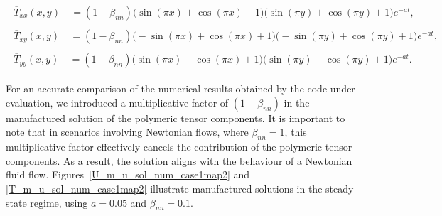 \documentclass[preprint, 12pt]{elsarticle}
\begin{document}
\small
\begin{gather}
    \begin{aligned}
        \overline{T}_{xx}(x,y) &~= (1-\beta_{nn})\bigg(\sin(\pi x)+\cos(\pi x)+1\bigg)\bigg(\sin(\pi  y)+\cos (\pi y)+1\bigg)e^{-a t},\label{eq:txx_case0_2}
    \end{aligned}
\end{gather}
\begin{gather}
    \begin{aligned}
        \overline{T}_{xy}(x,y) &~= (1-\beta_{nn})\bigg(-\sin(\pi x)+\cos (\pi x)+1\bigg)\bigg(-\sin (\pi  y)+\cos (\pi  y)+1\bigg)e^{-a t},\label{eq:txy_case0_2}
    \end{aligned}
\end{gather}
\begin{gather}
    \begin{aligned}
        \overline{T}_{yy}(x,y) &~= (1-\beta_{nn})\bigg(\sin(\pi x)-\cos(\pi  x)+1\bigg)\bigg(\sin(\pi y)-\cos(\pi y)+1\bigg)e^{-a t}.\label{eq:tyy_case0_2}
    \end{aligned}
\end{gather}

\normalsize

For an accurate comparison of the numerical results obtained by the code under evaluation, we introduced a multiplicative factor of $(1-\beta_{nn})$ in the manufactured solution of the polymeric tensor components. It is important to note that in scenarios involving Newtonian flows, where $\beta_{nn} = 1$, this multiplicative factor effectively cancels the contribution of the polymeric tensor components. As a result, the solution aligns with the behaviour of a Newtonian fluid flow. Figures~\ref{U_m_u_sol_num_case1map2} and \ref{T_m_u_sol_num_case1map2} illustrate manufactured solutions in the steady-state regime, using $a = 0.05$ and $\beta_{nn}=0.1$.
\end{document}
